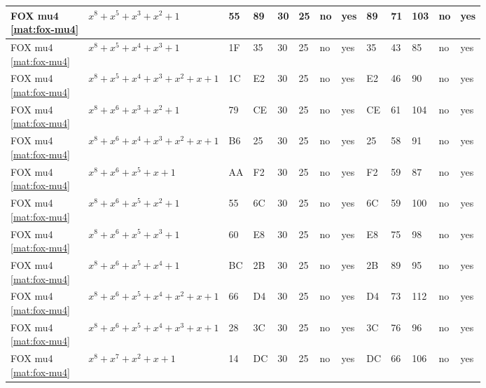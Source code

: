 \begin{tiny}
\begin{longtable}{|l|l|l|l|l|l|l|l|l|l|l|l|l|}
\shortstack{FOX mu4 \\ \eqref{mat:fox-mu4}} & $x^8 + x^5 + x^3 + x^2 + 1$ & 55 & 89 & 30 & 25 & no & yes & 89 & 71 & 103 & no & yes \\ \hline
\shortstack{FOX mu4 \\ \eqref{mat:fox-mu4}} & $x^8 + x^5 + x^4 + x^3 + 1$ & 1F & 35 & 30 & 25 & no & yes & 35 & 43 & 85 & no & yes \\ \hline
\shortstack{FOX mu4 \\ \eqref{mat:fox-mu4}} & $x^8 + x^5 + x^4 + x^3 + x^2 + x + 1$ & 1C & E2 & 30 & 25 & no & yes & E2 & 46 & 90 & no & yes \\ \hline
\shortstack{FOX mu4 \\ \eqref{mat:fox-mu4}} & $x^8 + x^6 + x^3 + x^2 + 1$ & 79 & CE & 30 & 25 & no & yes & CE & 61 & 104 & no & yes \\ \hline
\shortstack{FOX mu4 \\ \eqref{mat:fox-mu4}} & $x^8 + x^6 + x^4 + x^3 + x^2 + x + 1$ & B6 & 25 & 30 & 25 & no & yes & 25 & 58 & 91 & no & yes \\ \hline
\shortstack{FOX mu4 \\ \eqref{mat:fox-mu4}} & $x^8 + x^6 + x^5 + x + 1$ & AA & F2 & 30 & 25 & no & yes & F2 & 59 & 87 & no & yes \\ \hline
\shortstack{FOX mu4 \\ \eqref{mat:fox-mu4}} & $x^8 + x^6 + x^5 + x^2 + 1$ & 55 & 6C & 30 & 25 & no & yes & 6C & 59 & 100 & no & yes \\ \hline
\shortstack{FOX mu4 \\ \eqref{mat:fox-mu4}} & $x^8 + x^6 + x^5 + x^3 + 1$ & 60 & E8 & 30 & 25 & no & yes & E8 & 75 & 98 & no & yes \\ \hline
\shortstack{FOX mu4 \\ \eqref{mat:fox-mu4}} & $x^8 + x^6 + x^5 + x^4 + 1$ & BC & 2B & 30 & 25 & no & yes & 2B & 89 & 95 & no & yes \\ \hline
\shortstack{FOX mu4 \\ \eqref{mat:fox-mu4}} & $x^8 + x^6 + x^5 + x^4 + x^2 + x + 1$ & 66 & D4 & 30 & 25 & no & yes & D4 & 73 & 112 & no & yes \\ \hline
\shortstack{FOX mu4 \\ \eqref{mat:fox-mu4}} & $x^8 + x^6 + x^5 + x^4 + x^3 + x + 1$ & 28 & 3C & 30 & 25 & no & yes & 3C & 76 & 96 & no & yes \\ \hline
\shortstack{FOX mu4 \\ \eqref{mat:fox-mu4}} & $x^8 + x^7 + x^2 + x + 1$ & 14 & DC & 30 & 25 & no & yes & DC & 66 & 106 & no & yes \\ \hline

\end{longtable}
\end{tiny}
